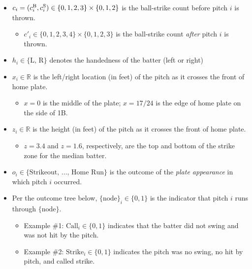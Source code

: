 \documentclass{article}
\begin{document}
    \begin{itemize}
      \item $c_i = (c_i^{\mbox{\scriptsize B}}, c_i^{\mbox{\scriptsize S}}) \in \{0, 1, 2, 3\} \times \{0, 1, 2\}$ is the ball-strike count before pitch $i$ is thrown.
      \begin{itemize}
        \item $c'_i \in \{0, 1, 2, 3, 4\} \times \{0, 1, 2, 3\}$ is the ball-strike count {\it after} pitch $i$ is thrown.
      \end{itemize}
      \item $h_i \in \{\mbox{L, R}\}$ denotes the handedness of the batter (left or right)
      \item $x_i \in \mathbb{R}$ is the left/right location (in feet) of the pitch as it crosses the front of home plate.
      \begin{itemize}
        \item $x = 0$ is the middle of the plate; $x = 17 / 24$ is the edge of home plate on the side of 1B.
      \end{itemize}
      \item $z_i \in \mathbb{R}$ is the height (in feet) of the pitch as it crosses the front of home plate.
      \begin{itemize}
        \item $z = 3.4$ and $z = 1.6$, respectively, are the top and bottom of the strike zone for the median batter.
      \end{itemize}
      \item $o_i \in \{\mbox{Strikeout, ..., Home Run}\}$ is the outcome of the {\it plate appearance} in which pitch $i$ occurred.
      \item Per the outcome tree below, $\{\mbox{node}\}_i \in \{0, 1\}$ is the indicator that pitch $i$ runs through $\{\mbox{node}\}$.
      \begin{itemize}
        \item Example \#1: $\mbox{Call}_i \in \{0, 1\}$ indicates that the batter did not swing and was not hit by the pitch.
        \item Example \#2: $\mbox{Strike}_i \in \{0, 1\}$ indicates the pitch was no swing, no hit by pitch, and called strike.
      \end{itemize}
    \end{itemize}
\end{document}
